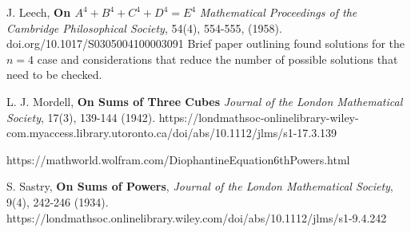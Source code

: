 \documentclass{article}
\begin{document}
\begin{flushleft}
\begin{thebibliography}{9}
J. Leech, {\bf On $A^4 + B^4 + C^4 + D^4 = E^4$}
    \textit{Mathematical Proceedings of the Cambridge Philosophical Society}, 54(4), 554-555, (1958).
        doi.org/10.1017/S0305004100003091
        \subitem Brief paper outlining found solutions for the $n=4$ case and considerations that reduce the number of possible solutions that need to be checked.

L. J. Mordell, {\bf On Sums of Three Cubes}
\textit{Journal of the London Mathematical Society}, 17(3), 139-144 (1942). 
https://londmathsoc-onlinelibrary-wiley-com.myaccess.library.utoronto.ca/doi/abs/10.1112/jlms/s1-17.3.139


https://mathworld.wolfram.com/DiophantineEquation6thPowers.html

S. Sastry, 
{\bf On Sums of Powers}, 
\textit{Journal of the London Mathematical Society}, 9(4), 242-246 (1934). 
https://londmathsoc.onlinelibrary.wiley.com/doi/abs/10.1112/jlms/s1-9.4.242

\end{thebibliography}

\end{flushleft}
\end{document}
